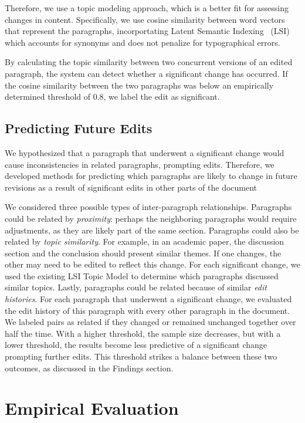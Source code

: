 Therefore, we use a topic modeling approach, which is a better fit for
assessing changes in content. Specifically, we use cosine similarity
between word vectors that represent the paragraphs, incorportating
Latent Semantic Indexing~\cite{deerwester1990indexing} (LSI) which
accounts for synonyms and does not penalize for typographical errors.

By calculating the topic similarity between two concurrent versions of
an edited paragraph, the system can detect whether a significant change
has occurred. If the cosine similarity between the two paragraphs was
below an empirically determined threshold of 0.8, we label the edit as
significant.

\subsection{Predicting Future Edits}\label{predicting-future-edits}

We hypothesized that a paragraph that underwent a significant change
would cause inconsistencies in related paragraphs, prompting edits.
Therefore, we developed methods for predicting which paragraphs are
likely to change in future revisions as a result of significant edits in
other parts of the document

We considered three possible types of inter-paragraph relationships.
Paragraphs could be related by \emph{proximity}: perhaps the neighboring
paragraphs would require adjustments, as they are likely part of the
same section. Paragraphs could also be related by \emph{topic
similarity}. For example, in an academic paper, the discussion section
and the conclusion should present similar themes. If one changes, the
other may need to be edited to reflect this change. For each significant
change, we used the existing LSI Topic Model to determine which
paragraphs discussed similar topics. Lastly, paragraphs could be related
because of similar \emph{edit histories}. For each paragraph that
underwent a significant change, we evaluated the edit history of this
paragraph with every other paragraph in the document. We labeled pairs
as related if they changed or remained unchanged together over half the
time. With a higher threshold, the sample size decreases, but with a
lower threshold, the results become less predictive of a significant
change prompting further edits. This threshold strikes a balance between
these two outcomes, as discussed in the Findings section.

\section{Empirical Evaluation}\label{empirical-evaluation}

